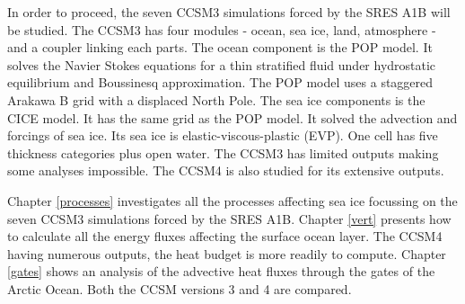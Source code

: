 In order to proceed, the seven CCSM3 simulations forced by the SRES A1B will be studied. The CCSM3 has four modules - ocean, sea ice, land, atmosphere - and a coupler linking each parts. The ocean component is the POP model. It solves the Navier Stokes equations for a thin stratified fluid under hydrostatic equilibrium and Boussinesq approximation. The POP model uses a staggered Arakawa B grid with a displaced North Pole. The sea ice components is the CICE model. It has the same grid as the POP model. It solved the advection and forcings of sea ice. Its sea ice is elastic-viscous-plastic (EVP). One cell has five thickness categories plus open water. The CCSM3 has limited outputs making some analyses impossible. The CCSM4 is also studied for its extensive outputs. 

Chapter \ref{processes} investigates all the processes affecting sea ice focussing on the seven CCSM3 simulations forced by the SRES A1B. Chapter \ref{vert} presents how to calculate all the energy fluxes affecting the surface ocean layer. The CCSM4 having numerous outputs, the heat budget is more readily to compute. Chapter \ref{gates} shows an analysis of the advective heat fluxes through the gates of the Arctic Ocean. Both the CCSM versions 3 and 4 are compared. 






